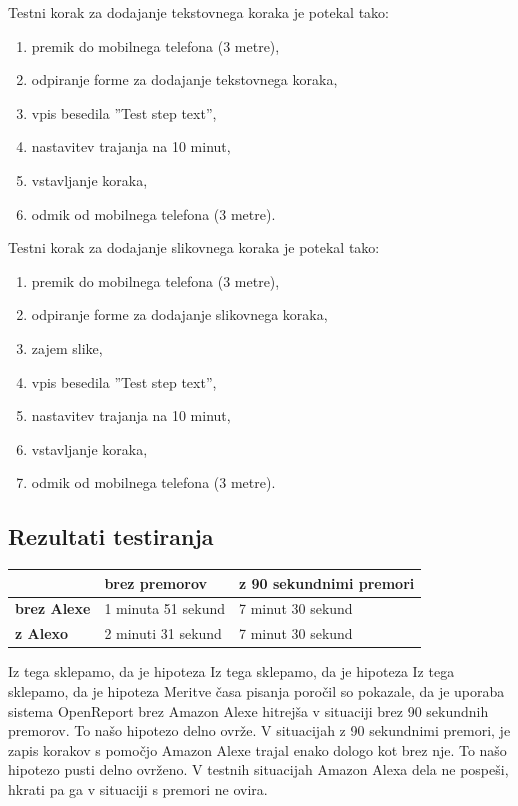 \documentclass[a4paper, 12pt]{book}
\begin{document}
\noindent Testni korak za dodajanje tekstovnega koraka je potekal tako:
\begin{enumerate}
	\item premik do mobilnega telefona (3 metre),
	\item odpiranje forme za dodajanje tekstovnega koraka,
	\item vpis besedila ''Test step text'',
	\item nastavitev trajanja na 10 minut,
	\item vstavljanje koraka,
	\item odmik od mobilnega telefona (3 metre).
\end{enumerate}

\noindent Testni korak za dodajanje slikovnega koraka je potekal tako:
\begin{enumerate}
	\item premik do mobilnega telefona (3 metre),
	\item odpiranje forme za dodajanje slikovnega koraka,
	\item zajem slike,
	\item vpis besedila ''Test step text'',
	\item nastavitev trajanja na 10 minut,
	\item vstavljanje koraka,
	\item odmik od mobilnega telefona (3 metre).
\end{enumerate}


\subsection{Rezultati testiranja}

\noindent\begin{tabular}{p{}|p{}|p{}}    %
  {\bf } & {\bf brez premorov}                             & {\bf z 90 sekundnimi premori} \\ \hline
  {\bf brez Alexe} & 1 minuta 51 sekund & 7 minut 30 sekund \\
  {\bf z Alexo} & 2 minuti 31 sekund & 7 minut 30 sekund \\
\end{tabular}

\bigbreak
\bigbreak
\noindent Iz tega sklepamo, da je hipoteza
\noindent Iz tega sklepamo, da je hipoteza
\noindent Iz tega sklepamo, da je hipoteza
Meritve časa pisanja poročil so pokazale, da je uporaba sistema OpenReport brez Amazon Alexe hitrejša v situaciji brez 90 sekundnih premorov.
To našo hipotezo delno ovrže.
V situacijah z 90 sekundnimi premori, je zapis korakov s pomočjo Amazon Alexe trajal enako dologo kot brez nje.
To našo hipotezo pusti delno ovrženo.
V testnih situacijah Amazon Alexa dela ne pospeši, hkrati pa ga v situaciji s premori ne ovira.
\end{document}
